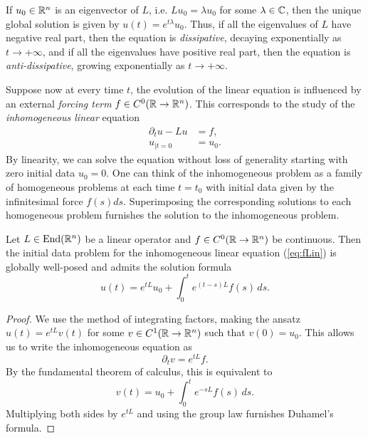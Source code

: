 \begin{remark}
	If $u_0 \in \mathbb R^n$ is an eigenvector of $L$, i.e. $Lu_0 = \lambda u_0$ for some $\lambda \in \mathbb C$, then the unique global solution is given by $u(t) = e^{t\lambda} u_0$. Thus, if all the eigenvalues of $L$ have negative real part, then the equation is \textit{dissipative}, decaying exponentially as $t\to + \infty$, and if all the eigenvalues have positive real part, then the equation is \textit{anti-dissipative}, growing exponentially as $t \to + \infty$. 
\end{remark}

Suppose now at every time $t$, the evolution of the linear equation is influenced by an external \textit{forcing term} $f \in C^0 (\mathbb R \to \mathbb R^n)$. This corresponds to the study of the \emph{inhomogeneous linear} equation
	\begin{equation}
		\begin{split}
			\partial_t u - Lu 
				&= f, \\
			u_{|t = 0}
				&= u_0.
		\end{split}
		\tag{fLin}
		\label{eq:fLin}
	\end{equation}
By linearity, we can solve the equation without loss of generality starting with zero initial data $u_0 = 0$. One can think of the inhomogeneous problem as a family of homogeneous problems at each time $t = t_0$ with initial data given by the infinitesimal force $f (s) ds$. Superimposing the corresponding solutions to each homogeneous problem furnishes the solution to the inhomogeneous problem. 

\begin{theorem}
	Let $L \in \operatorname{End} (\mathbb R^n)$ be a linear operator and $f \in C^0 (\mathbb R \to \mathbb R^n)$ be continuous. Then the initial data problem for the inhomogeneous linear equation (\ref{eq:fLin}) is globally well-posed and admits the solution formula
		\[ u(t) = e^{t L} u_0 + \int_0^t e^{(t - s) L} f(s) \, ds .\]	
\end{theorem}

\begin{proof}
	We use the method of integrating factors, making the ansatz $u(t) = e^{tL} v(t)$ for some $v \in C^1 (\mathbb R \to \mathbb R^n)$ such that $v(0) = u_0$. This allows us to write the inhomogeneous equation as 
		\[ \partial_t v = e^{tL} f. \]
	By the fundamental theorem of calculus, this is equivalent to 
		\[ v(t) = u_0 + \int_0^t e^{-s L} f(s) \, ds. \]
	Multiplying both sides by $e^{tL}$ and using the group law furnishes Duhamel's formula. 		
\end{proof}


